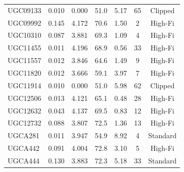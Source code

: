 \begin{longtable}{lcccccc}
UGC09133 & 0.010 & 0.000 & 51.0 & 5.17 & 65 & Clipped \\
UGC09992 & 0.145 & 4.172 & 70.6 & 1.50 & 2 & High-Fi \\
UGC10310 & 0.087 & 3.881 & 69.3 & 1.09 & 4 & High-Fi \\
UGC11455 & 0.011 & 4.196 & 68.9 & 0.56 & 33 & High-Fi \\
UGC11557 & 0.012 & 3.846 & 64.6 & 1.49 & 9 & High-Fi \\
UGC11820 & 0.012 & 3.666 & 59.1 & 3.97 & 7 & High-Fi \\
UGC11914 & 0.010 & 0.000 & 51.0 & 5.98 & 62 & Clipped \\
UGC12506 & 0.013 & 4.121 & 65.1 & 0.48 & 28 & High-Fi \\
UGC12632 & 0.043 & 4.137 & 69.5 & 0.83 & 12 & High-Fi \\
UGC12732 & 0.088 & 3.807 & 72.5 & 1.36 & 13 & High-Fi \\
UGCA281 & 0.011 & 3.947 & 54.9 & 8.92 & 4 & Standard \\
UGCA442 & 0.091 & 4.004 & 72.8 & 3.10 & 5 & High-Fi \\
UGCA444 & 0.130 & 3.883 & 72.3 & 5.18 & 33 & Standard \\
\bottomrule
\end{longtable}
